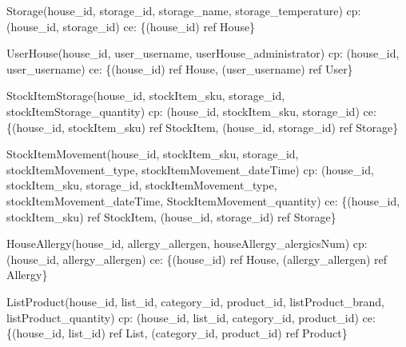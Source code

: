 {\begin{description}
		\item Storage(house\_id, storage\_id, storage\_name, storage\_temperature)  \newline
		\acrshort{cp}:(house\_id, storage\_id) \newline
		\acrshort{ce}: \{(house\_id) ref House\}
	
		\item UserHouse(house\_id, user\_username, userHouse\_administrator) \newline
		\acrshort{cp}: (house\_id, user\_username) \newline
		\acrshort{ce}: \{(house\_id) ref House, (user\_username) ref User\}
		
		\item StockItemStorage(house\_id, stockItem\_sku, storage\_id, stockItemStorage\_quantity) \newline
		\acrshort{cp}: (house\_id, stockItem\_sku, storage\_id) \newline
		\acrshort{ce}: \{(house\_id, stockItem\_sku) ref StockItem, (house\_id, storage\_id) ref Storage\}
		
		\item StockItemMovement(house\_id, stockItem\_sku, storage\_id, stockItemMovement\_type, \newline stockItemMovement\_dateTime) \newline
		\acrshort{cp}: (house\_id, stockItem\_sku, storage\_id, stockItemMovement\_type, \newline stockItemMovement\_dateTime, StockItemMovement\_quantity) \newline
		\acrshort{ce}: \{(house\_id, stockItem\_sku) ref StockItem, (house\_id, storage\_id) ref Storage\}
		
		\item HouseAllergy(house\_id, allergy\_allergen, houseAllergy\_alergicsNum) \newline
		\acrshort{cp}: (house\_id, allergy\_allergen) \newline
		\acrshort{ce}: \{(house\_id) ref House, (allergy\_allergen) ref Allergy\}
	
		\item ListProduct(house\_id, list\_id, category\_id, product\_id, listProduct\_brand, listProduct\_quantity) \newline
		\acrshort{cp}: (house\_id, list\_id, category\_id, product\_id) \newline
		\acrshort{ce}: \{(house\_id, list\_id) ref List, (category\_id, product\_id) ref Product\}
	

\end{description}}
